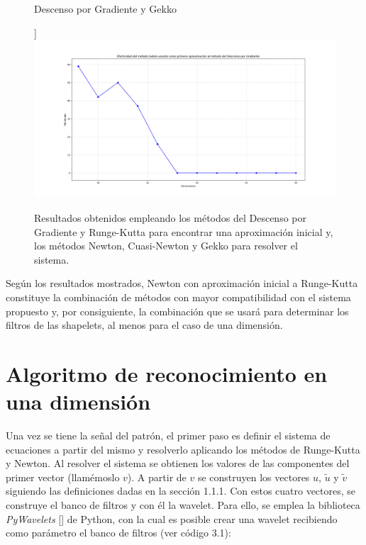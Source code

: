 \begin{figure}[h]
\begin{center}
\begin{scriptsize}
        Descenso por Gradiente y Gekko
        \end{scriptsize}]{
        \includegraphics[width=.45\textwidth]{Graphics/GD_Gekko.png}
        \label{GD-G}}
    \caption{Resultados obtenidos empleando los m\'etodos del Descenso por Gradiente y Runge-Kutta para encontrar una aproximaci\'on inicial y, los m\'etodos Newton, Cuasi-Newton y Gekko para resolver el sistema.}
    \label{metodos-combinados}
  \end{center}
\end{figure}

\par Seg\'un los resultados mostrados, Newton con aproximaci\'on inicial a Runge-Kutta constituye la combinaci\'on de m\'etodos con mayor compatibilidad con el sistema propuesto y, por consiguiente, la combinaci\'on que se usar\'a para determinar los filtros de las shapelets, al menos para el caso de una dimensi\'on.\\

\section{Algoritmo de reconocimiento en una dimensi\'on}

\par Una vez se tiene la se\~nal del patr\'on, el primer paso es definir el sistema de ecuaciones a partir del mismo y resolverlo aplicando los m\'etodos de Runge-Kutta y Newton. Al resolver el sistema se obtienen los valores de las componentes del primer vector (llam\'emoslo $v$). A partir de $v$ se construyen los vectores $u$, $\tilde{u}$ y $\tilde{v}$ siguiendo las definiciones dadas en la secci\'on 1.1.1. Con estos cuatro vectores, se construye el banco de filtros y con \'el la wavelet. Para ello, se emplea la biblioteca \textit{PyWavelets} [\cite{27}] de Python, con la cual es posible crear una wavelet recibiendo como par\'ametro el banco de filtros (ver c\'odigo 3.1):\\

